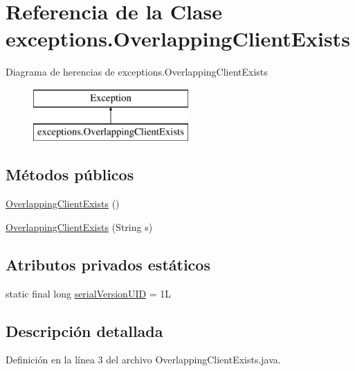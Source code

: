 \hypertarget{classexceptions_1_1_overlapping_client_exists}{}\section{Referencia de la Clase exceptions.\+Overlapping\+Client\+Exists}
\label{classexceptions_1_1_overlapping_client_exists}
Diagrama de herencias de exceptions.\+Overlapping\+Client\+Exists\begin{figure}[H]
\begin{center}
\leavevmode
\includegraphics[height=2.000000cm]{classexceptions_1_1_overlapping_client_exists}
\end{center}
\end{figure}
\subsection*{Métodos públicos}
\begin{DoxyCompactItemize}
\item 
\mbox{\hyperlink{classexceptions_1_1_overlapping_client_exists_a36cf31e2cc8a2122b2fecff9c4ef4c2a}{Overlapping\+Client\+Exists}} ()
\item 
\mbox{\hyperlink{classexceptions_1_1_overlapping_client_exists_a5ca036cfe73f50425246eac94a7b06f0}{Overlapping\+Client\+Exists}} (String s)
\end{DoxyCompactItemize}
\subsection*{Atributos privados estáticos}
\begin{DoxyCompactItemize}
\item 
static final long \mbox{\hyperlink{classexceptions_1_1_overlapping_client_exists_a9e613393e0b8e7a6dfe0ac3ad3b8f923}{serial\+Version\+U\+ID}} = 1L
\end{DoxyCompactItemize}


\subsection{Descripción detallada}


Definición en la línea 3 del archivo Overlapping\+Client\+Exists.\+java.



